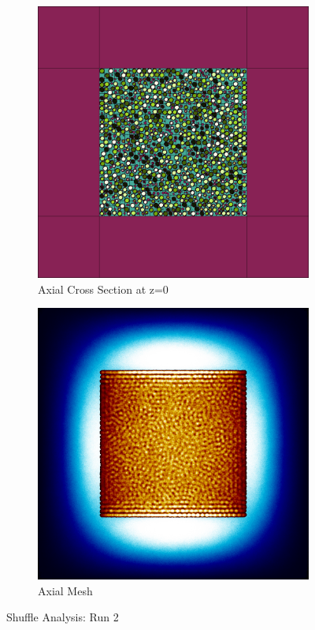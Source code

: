 \begin{figure}[H]
\begin{subfigure}{0.45\textwidth}
  \includegraphics[width=0.95\linewidth]{figures/2345601/2345601-v}
  \caption{Axial Cross Section at z=0 }
  \label{fig:2345601-v}
\end{subfigure}
%
\begin{subfigure}{0.45\textwidth}
  \includegraphics[width=0.95\linewidth]{figures/2345601/2345601-vm}
  \caption{Axial Mesh}
  \label{fig:2345601-vm}
\end{subfigure}
%
\caption{Shuffle Analysis: Run 2}
\label{fig:0-60}
\end{figure}